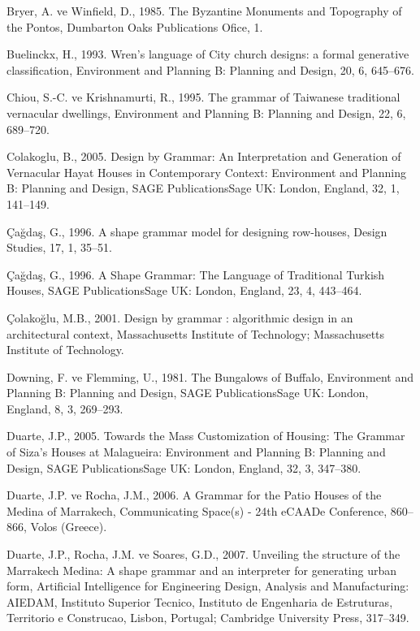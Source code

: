 \documentclass[12pt,turkish,a4paperpaper,]{report}
\begin{document}
\leavevmode\hypertarget{ref-Bryer:2011ul}{}%
Bryer, A. ve Winfield, D., 1985. The Byzantine Monuments and Topography
of the Pontos, Dumbarton Oaks Publications Ofice, 1.

\leavevmode\hypertarget{ref-Buelinckx:1993io}{}%
Buelinckx, H., 1993. Wren's language of City church designs: a formal
generative classification, Environment and Planning B: Planning and
Design, 20, 6, 645--676.

\leavevmode\hypertarget{ref-Chiou:1995gj}{}%
Chiou, S.-C. ve Krishnamurti, R., 1995. The grammar of Taiwanese
traditional vernacular dwellings, Environment and Planning B: Planning
and Design, 22, 6, 689--720.

\leavevmode\hypertarget{ref-Colakoglu:2005kc}{}%
Colakoglu, B., 2005. Design by Grammar: An Interpretation and Generation
of Vernacular Hayat Houses in Contemporary Context: Environment and
Planning B: Planning and Design, SAGE PublicationsSage UK: London,
England, 32, 1, 141--149.

\leavevmode\hypertarget{ref-Cagdas:1996fe}{}%
Çağdaş, G., 1996. A shape grammar model for designing row-houses, Design
Studies, 17, 1, 35--51.

\leavevmode\hypertarget{ref-Cagdas:1996ft}{}%
Çağdaş, G., 1996. A Shape Grammar: The Language of Traditional Turkish
Houses, SAGE PublicationsSage UK: London, England, 23, 4, 443--464.

\leavevmode\hypertarget{ref-Colakoglu:2001wi}{}%
Çolakoğlu, M.B., 2001. Design by grammar : algorithmic design in an
architectural context, Massachusetts Institute of Technology;
Massachusetts Institute of Technology.

\leavevmode\hypertarget{ref-Downing:1981dx}{}%
Downing, F. ve Flemming, U., 1981. The Bungalows of Buffalo, Environment
and Planning B: Planning and Design, SAGE PublicationsSage UK: London,
England, 8, 3, 269--293.

\leavevmode\hypertarget{ref-Duarte:2005gd}{}%
Duarte, J.P., 2005. Towards the Mass Customization of Housing: The
Grammar of Siza's Houses at Malagueira: Environment and Planning B:
Planning and Design, SAGE PublicationsSage UK: London, England, 32, 3,
347--380.

\leavevmode\hypertarget{ref-Duarte:2006wg}{}%
Duarte, J.P. ve Rocha, J.M., 2006. A Grammar for the Patio Houses of the
Medina of Marrakech, Communicating Space(s) - 24th eCAADe Conference,
860--866, Volos (Greece).

\leavevmode\hypertarget{ref-Duarte:2007eq}{}%
Duarte, J.P., Rocha, J.M. ve Soares, G.D., 2007. Unveiling the structure
of the Marrakech Medina: A shape grammar and an interpreter for
generating urban form, Artificial Intelligence for Engineering Design,
Analysis and Manufacturing: AIEDAM, Instituto Superior Tecnico,
Instituto de Engenharia de Estruturas, Territorio e Construcao, Lisbon,
Portugal; Cambridge University Press, 317--349.
\end{document}
